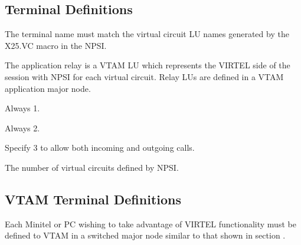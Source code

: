 \documentclass[letterpaper,10pt,english]{sphinxmanual}
\begin{document}
\sphinxAtStartPar
{}

\ignorespaces 

\subsection{Terminal Definitions}
\label{\detokenize{connectivity_guide:index-70}}\label{\detokenize{connectivity_guide:id32}}\begin{description}
\sphinxAtStartPar
The terminal name must match the virtual circuit LU names generated
by the X25.VC macro in the NPSI.

\sphinxAtStartPar
The application relay is a VTAM LU which represents the VIRTEL side
of the session with NPSI for each virtual circuit. Relay LUs are
defined in a VTAM application major node.

\sphinxAtStartPar
Always 1.

\sphinxAtStartPar
Always 2.

\sphinxAtStartPar
Specify 3 to allow both incoming and outgoing calls.

\sphinxAtStartPar
The number of virtual circuits defined by NPSI.

\end{description}

\ignorespaces 

\subsection{VTAM Terminal Definitions}
\label{\detokenize{connectivity_guide:index-71}}\label{\detokenize{connectivity_guide:id33}}
\sphinxAtStartPar
Each Minitel or PC wishing to take advantage of VIRTEL functionality must be defined to VTAM in a switched major node similar to that shown in section {\hyperref[\detokenize{connectivity_guide:v461cn-x25gateline}]{}}.
\end{document}
